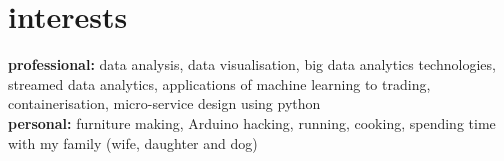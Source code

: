\documentclass[]{friggeri-cv-a4}
\begin{document}

\section{interests}

\textbf{professional:} data analysis, data visualisation, big data analytics technologies, streamed data analytics, applications of machine learning to trading, containerisation, micro-service design using python \\

\textbf{personal:} furniture making, Arduino hacking, running, cooking, spending time with my family (wife, daughter and dog)


%
%
%
%
%
%

\end{document}
